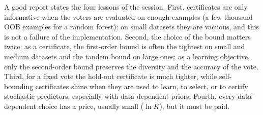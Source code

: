 \documentclass[11pt]{article}
\begin{document}
\begin{solution}
A good report states the four lessons of the session. First, certificates are only informative when the voters
are evaluated on enough examples (a few thousand OOB examples for a random forest): on small datasets they are
vacuous, and this is not a failure of the implementation. Second, the choice of the bound matters twice: as a
certificate, the first-order bound is often the tightest on small and medium datasets and the tandem bound on large
ones; as a learning objective, only the second-order bound preserves the diversity and the accuracy of the vote.
Third, for a fixed vote the hold-out certificate is much tighter, while self-bounding certificates shine when they are
used to learn, to select, or to certify stochastic predictors, especially with data-dependent priors. Fourth, every
data-dependent choice has a price, usually small ($\ln K$), but it must be paid.
\end{solution}
\end{document}
